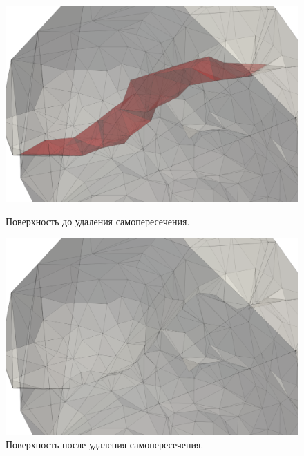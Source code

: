 \begin{figure}[h]
  \centering
  \begin{minipage}[h]{0.49\textwidth}
    \includegraphics[width=\textwidth]{pics/pic_self_intersection_on.png}
    \caption{Поверхность до удаления самопересечения.}\label{fig:pic_self_intersection_on}
  \end{minipage}
  \hfill
  \begin{minipage}[h]{0.49\textwidth}
    \includegraphics[width=\textwidth]{pics/pic_self_intersection_off.png}
    \caption{Поверхность после удаления самопересечения.}\label{fig:pic_self_intersection_off}
  \end{minipage}
\end{figure}

